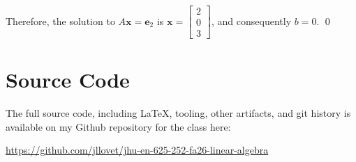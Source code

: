 \documentclass[10pt,letterpaper,final]{report}
\begin{document}
Therefore, the solution to $A\mathbf{x} = \mathbf{e}_2$ is $\mathbf{x} = \begin{bmatrix}
    2 \\0\\3
  \end{bmatrix}$, and consequently $b = 0$. \qed

\pagebreak

\section*{Source Code}
The full source code, including LaTeX, tooling, other artifacts, and git history is available on my Github repository for the class here:
\begin{center}
  \url{https://github.com/jllovet/jhu-en-625-252-fa26-linear-algebra}
\end{center}

\printbibliography
\end{document}
